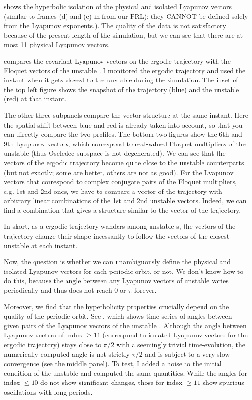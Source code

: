 \begin{description}
 shows the hyperbolic isolation of the physical and
isolated Lyapunov vectors (similar to frames (d) and (e) in 
from our PRL); they
CANNOT be defined solely from the Lyapunov exponents.). The quality of
the data is not satisfactory because of the present length of the
simulation, but we can see that there are at most 11 physical Lyapunov vectors.


 compares the covariant Lyapunov vectors on the 
ergodic trajectory with the Floquet vectors of the {unstable \po}. I monitored the
ergodic trajectory and used the instant when it gets closest to the {unstable \po}
during the simulation. The inset of the top left figure shows the
snapshot of the trajectory (blue) and the {unstable \po} (red) at that instant.

The other three subpanels compare the vector structure at the same
instant. Here the spatial shift between blue and red is already taken
into account, so that you can directly compare the two profiles. The
bottom two figures show the 6th and 9th Lyapunov vectors, which correspond to
real-valued Floquet multipliers of the {unstable \po} (thus Oseledec subspace is
not degenerated). We can see that the vectors of the ergodic trajectory
become quite close to the {unstable \po} counterparts (but not exactly; some are
better, others are not as good). For the Lyapunov vectors that correspond
to complex conjugate pairs of the Floquet multipliers, e.g. 1st and 2nd
ones, we have to compare a vector of the trajectory with arbitrary
linear combinations of the 1st and 2nd {unstable \po} vectors. Indeed, we can find
a combination that gives a structure similar to the vector of the
trajectory.

In short, as a ergodic trajectory wanders among {unstable \po}s, the vectors of the
trajectory change their shape incessantly to follow the vectors of the
closest {unstable \po} at each instant.


Now, the question is whether we can unambiguously define the physical
and isolated Lyapunov vectors for each periodic orbit, or not. We don't know how to
do this, because the angle between any Lyapunov vectors
of {unstable \po} varies periodically and thus does not reach 0 or 
$\pi$ forever.

Moreover, we find that the hyperbolicity properties crucially depend on
the quality of the periodic orbit. See 
, which shows
time-series of angles between given pairs of the Lyapunov vectors of the
{unstable \po}. Although the angle between Lyapunov vectors of index $\geq 11$ (correspond
to isolated Lyapunov vectors for the ergodic trajectory) stays close to $\pi/2$ with a
seemingly trivial time-evolution, the numerically computed angle is not
strictly $\pi/2$ and is subject to a very slow convergence (see the middle
panel). To test, I added a noise to the initial condition of the {unstable \po} and
computed the same quantities. While the angles for index $\leq 10$ do not
show significant changes, those for index $\geq 11$ show spurious
oscillations with long periods.


\end{description}

